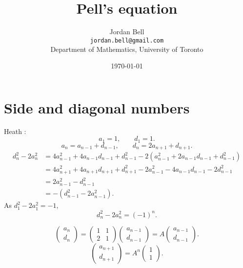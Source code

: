 \documentclass{article}
\theoremstyle{definition}
\begin{document}
\title{Pell's equation}
\author{Jordan Bell\\ \texttt{jordan.bell@gmail.com}\\Department of Mathematics, University of Toronto}
\date{\today}
\maketitle


\section{Side and diagonal numbers}
Heath \cite[pp.~117--118]{diophantus}:
\[
a_1=1, \qquad d_1=1.
\]
\[
a_n=a_{n-1}+d_{n-1},\qquad d_n=2a_{n+1}+d_{n+1}.
\]
\begin{align*}
d_n^2-2a_n^2&=4a_{n-1}^2+4a_{n-1}d_{n-1}+d_{n-1}^2
-2(a_{n-1}^2+2a_{n-1}d_{n-1}+d_{n-1}^2)\\
&=4a_{n+1}^2+4a_{n+1}d_{n+1}+d_{n+1}^2-2a_{n-1}^2
-4a_{n-1}d_{n-1}-2d_{n-1}^2\\
&=2a_{n-1}^2-d_{n-1}^2\\
&=-(d_{n-1}^2-2a_{n-1}^2).
\end{align*}
As $d_1^2-2a_1^2=-1$,
\[
d_n^2-2a_n^2 = (-1)^n.
\]

\[
\begin{pmatrix}a_n\\d_n\end{pmatrix}
=\begin{pmatrix}1&1\\2&1\end{pmatrix}
\begin{pmatrix}
a_{n-1}\\
d_{n-1}
\end{pmatrix}
=A\begin{pmatrix}
a_{n-1}\\
d_{n-1}
\end{pmatrix}.
\]
\[
\begin{pmatrix}a_{n+1}\\d_{n+1}\end{pmatrix} = A^n \begin{pmatrix}1\\1\end{pmatrix}.
\]
\end{document}
